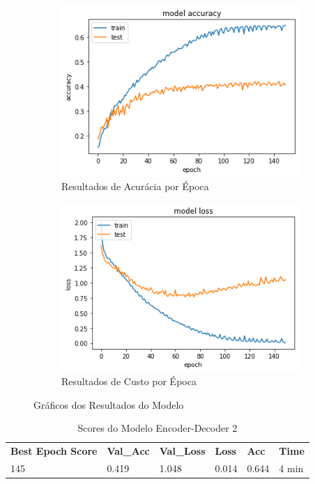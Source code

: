 \begin{figure}[H]
  \centering
  \begin{subfigure}[b]{0.45\linewidth}
    \includegraphics[width=\linewidth]{img/enc-dec-2.png}
    \caption{Resultados de Acurácia por Época}
  \end{subfigure}
  \begin{subfigure}[b]{0.45\linewidth}
    \includegraphics[width=\linewidth]{img/enc-dec-2-loss.png}
    \caption{Resultados de Custo por Época}
  \end{subfigure}
  \caption{Gráficos dos Resultados do Modelo}
  \label{fig:plots2}
\end{figure}

\begin{table}[H]
\centering
\begin{tabular}{llllll}
\textbf{Best Epoch Score} & \textbf{Val\_Acc} & \textbf{Val\_Loss} & \textbf{Loss} & \textbf{Acc} & \textbf{Time} \\
145 & 0.419 & 1.048 & 0.014 & 0.644 & 4 min
\end{tabular}
\caption{Scores do Modelo Encoder-Decoder 2}
\label{tab:res-enc-dec-2}
\end{table}

